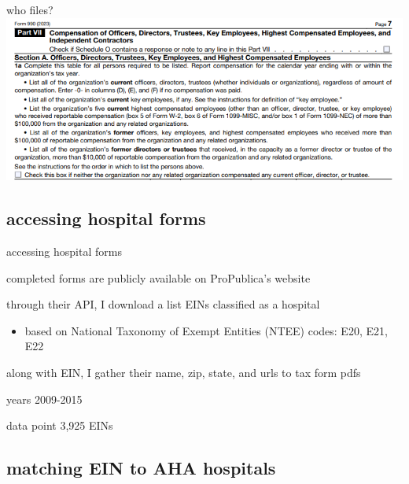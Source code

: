 \documentclass[notes,11pt, aspectratio=169]{beamer}
\newenvironment{wideitemize}{\itemize\addtolength{\itemsep}{10pt}}{\enditemize}
\begin{document}
\begin{frame}{who files?}
    \centering
    \includegraphics[scale=.7]{Graphics/990_snip_officerspage.PNG}
\end{frame}

\subsection{accessing hospital forms}

\begin{frame}{accessing hospital forms}\label{accessing hospital forms}
    \begin{wideitemize}
        \item completed forms are publicly available on ProPublica's website
        \item through their API, I download a list EINs classified as a hospital
        \begin{itemize}
            \item based on National Taxonomy of Exempt Entities (NTEE) codes: E20, E21, E22
        \end{itemize}
        \item along with EIN, I gather their name, zip, state, and urls to tax form pdfs
        \item years 2009-2015
    \end{wideitemize}

    \vspace{10mm}

    \begin{block}{data point}
        3,925 EINs \hspace{10pt} \hyperlink{why more?}{}
    \end{block}
\end{frame}

\subsection{matching EIN to AHA hospitals}
\end{document}
